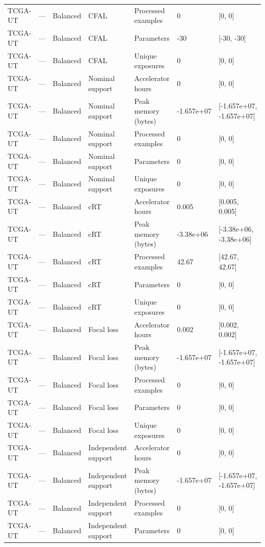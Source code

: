 \begin{longtable}{lllllll}
TCGA-UT & --- & Balanced & CFAL & Processed examples & 0 & [0, 0] \\
TCGA-UT & --- & Balanced & CFAL & Parameters & -30 & [-30, -30] \\
TCGA-UT & --- & Balanced & CFAL & Unique exposures & 0 & [0, 0] \\
TCGA-UT & --- & Balanced & Nominal support & Accelerator hours & 0 & [0, 0] \\
TCGA-UT & --- & Balanced & Nominal support & Peak memory (bytes) & -1.657e+07 & [-1.657e+07, -1.657e+07] \\
TCGA-UT & --- & Balanced & Nominal support & Processed examples & 0 & [0, 0] \\
TCGA-UT & --- & Balanced & Nominal support & Parameters & 0 & [0, 0] \\
TCGA-UT & --- & Balanced & Nominal support & Unique exposures & 0 & [0, 0] \\
TCGA-UT & --- & Balanced & cRT & Accelerator hours & 0.005 & [0.005, 0.005] \\
TCGA-UT & --- & Balanced & cRT & Peak memory (bytes) & -3.38e+06 & [-3.38e+06, -3.38e+06] \\
TCGA-UT & --- & Balanced & cRT & Processed examples & 42.67 & [42.67, 42.67] \\
TCGA-UT & --- & Balanced & cRT & Parameters & 0 & [0, 0] \\
TCGA-UT & --- & Balanced & cRT & Unique exposures & 0 & [0, 0] \\
TCGA-UT & --- & Balanced & Focal loss & Accelerator hours & 0.002 & [0.002, 0.002] \\
TCGA-UT & --- & Balanced & Focal loss & Peak memory (bytes) & -1.657e+07 & [-1.657e+07, -1.657e+07] \\
TCGA-UT & --- & Balanced & Focal loss & Processed examples & 0 & [0, 0] \\
TCGA-UT & --- & Balanced & Focal loss & Parameters & 0 & [0, 0] \\
TCGA-UT & --- & Balanced & Focal loss & Unique exposures & 0 & [0, 0] \\
TCGA-UT & --- & Balanced & Independent support & Accelerator hours & 0 & [0, 0] \\
TCGA-UT & --- & Balanced & Independent support & Peak memory (bytes) & -1.657e+07 & [-1.657e+07, -1.657e+07] \\
TCGA-UT & --- & Balanced & Independent support & Processed examples & 0 & [0, 0] \\
TCGA-UT & --- & Balanced & Independent support & Parameters & 0 & [0, 0] \\

\end{longtable}
